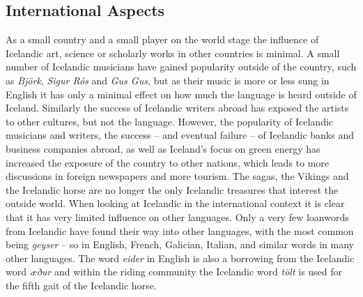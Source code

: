 \documentclass{../../metanetpaper}
\begin{document}
\begin{multicols}{2}
\subsection{International Aspects}

As a small country and a small player on the world stage the influence of Icelandic art, science or scholarly works in other countries is minimal. A small number of Icelandic musicians have gained popularity outside of the country, such as \textit{Björk}, \textit{Sigur Rós} and \textit{Gus Gus}, but as their music is more or less sung in English it has only a minimal effect on how much the language is heard outside of Iceland. Similarly the success of Icelandic writers abroad has exposed the artists to other cultures, but not the language. However, the popularity of Icelandic musicians and writers, the success -- and eventual failure -- of Icelandic banks and business companies abroad, as well as Iceland’s focus on green energy has increased the exposure of the country to other nations, which leads to more discussions in foreign newspapers and more tourism. The sagas, the Vikings and the Icelandic horse are no longer the only Icelandic treasures that interest the outside world.
When looking at Icelandic in the international context it is clear that it has very limited influence on other languages. Only a very few loanwords from Icelandic have found their way into other languages, with the most common being \textit{geyser} -- so in English, French, Galician, Italian, and similar words in many other languages. The word \textit{eider} in English is also a borrowing from the Icelandic word \textit{æður} and within the riding community the Icelandic word \textit{tölt} is used for the fifth gait of the Icelandic horse.


\end{multicols}
\end{document}
